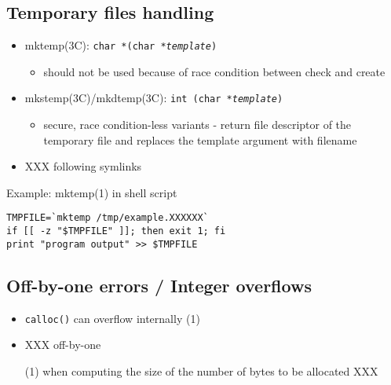 
\subsection{Temporary files handling}

\begin{itemize}
\item mktemp(3C): \texttt{char *(char *\emph{template})}
  \begin{itemize}
    \item should not be used because of race condition between check and create
  \end{itemize}
\item mkstemp(3C)/mkdtemp(3C):
  \texttt{int (char *\emph{template})}
  \begin{itemize}
  \item secure, race condition-less variants - return file descriptor of the
      temporary file and replaces the template argument with filename
  \end{itemize}
\item XXX following symlinks
\end{itemize}


Example: mktemp(1) in shell script

\begin{verbatim}
TMPFILE=`mktemp /tmp/example.XXXXXX`
if [[ -z "$TMPFILE" ]]; then exit 1; fi
print "program output" >> $TMPFILE
\end{verbatim}


\subsection{Off-by-one errors / Integer overflows}

\begin{itemize}
\item \texttt{calloc()} can overflow internally (1)
\item XXX off-by-one
\end{itemize}


\begin{itemize}
  \item[(1)] when computing the size of the number of bytes to be
  allocated XXX
\end{itemize}


